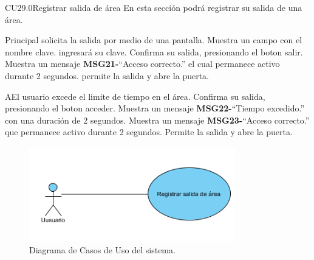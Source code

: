 


	\begin{UseCase}{CU29.0}{Registrar salida de área}{
		En esta sección podrá registrar su salida de una área.
	}
	\end{UseCase}

	\begin{UCtrayectoria}{Principal}
		\UCpaso[\UCactor] solicita la salida por medio de una pantalla.
		\UCpaso Muestra un campo con el nombre clave.
		\UCpaso[\UCactor] ingresará su clave.
		\UCpaso[\UCactor] Confirma su salida, presionando el boton salir.
		\UCpaso Muestra un mensaje {\bf MSG21-}``Acceso correcto.'' el cual permanece activo durante 2 segundos.
		\UCpaso permite la salida y abre la puerta.
	\end{UCtrayectoria}

		\begin{UCtrayectoriaA}{A}{El usuario excede el limite de tiempo en el área.}
			\UCpaso[\UCactor] Confirma su salida, presionando el boton acceder.
			\UCpaso Muestra un mensaje {\bf MSG22-}``Tiempo excedido.'' con una duración de 2 segundos.
			\UCpaso Muestra un mensaje {\bf MSG23-}``Acceso correcto.''  que permanece activo durante 2 segundos.
			\UCpaso Permite la salida y abre la puerta.
		\end{UCtrayectoriaA}

\begin{figure}[htbp!]
		\centering
			\includegraphics[width=0.8\textwidth]{images/registraSalidaArea}
		\caption{Diagrama de Casos de Uso del sistema.}
	\end{figure}
	